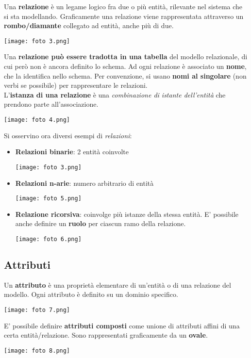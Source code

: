 \documentclass{article}
\begin{document}
Una \textbf{relazione} è un legame logico fra due o più entità, rilevante nel sistema che si sta modellando. Graficamente una relazione viene rappresentata attraverso un \textbf{rombo/diamante} collegato ad entità, anche più di due.
\begin{center}
    \texttt{[image: foto 3.png]}
\end{center}
Una \textbf{relazione può essere tradotta in una tabella} del modello relazionale, di cui però non è ancora definito lo schema. Ad ogni relazione è associato un \textbf{nome}, che la identifica nello schema. Per convenzione, si usano \textbf{nomi al singolare} (non verbi se possibile) per rappresentare le relazioni.\\
L'\textbf{istanza di una relazione} è una \textit{combinazione di istante dell'entità} che prendono parte all'associazione.
\begin{center}
    \texttt{[image: foto 4.png]}
\end{center}
Si osservino ora diversi esempi di \textit{relazioni}:
\begin{itemize}[label={-}, leftmargin=1cm]
    \item \textbf{Relazioni binarie}: 2 entità coinvolte
    \begin{center}
        \texttt{[image: foto 3.png]}
    \end{center}
    \item \textbf{Relazioni n-arie}: numero arbitrario di entità
    \begin{center}
        \texttt{[image: foto 5.png]}
    \end{center}
    \item \textbf{Relazione ricorsiva}: coinvolge più istanze della stessa entità. E' possibile anche definire un \textbf{ruolo} per ciascun ramo della relazione.
    \begin{center}
        \texttt{[image: foto 6.png]}
    \end{center}
\end{itemize}

\subsection*{Attributi}
\large

Un \textbf{attributo} è una proprietà elementare di un'entità o di una relazione del modello. Ogni attributo è definito su un dominio specifico.
\begin{center}
    \texttt{[image: foto 7.png]}
\end{center}
E' possibile definire \textbf{attributi composti} come unione di attributi affini di una certa entità/relazione. Sono rappresentati graficamente da un \textbf{ovale}.
\begin{center}
    \texttt{[image: foto 8.png]}\vspace{20pt}\\
\end{center}
\end{document}
